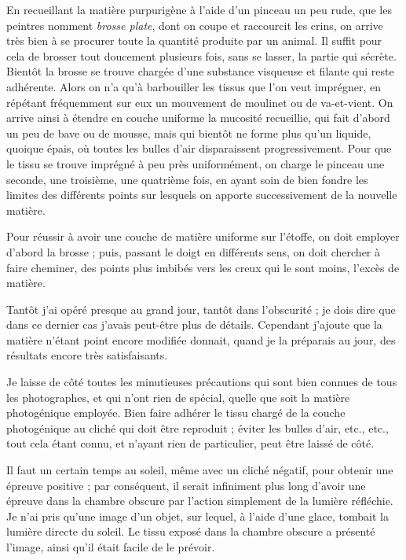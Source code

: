 \documentclass[a4paper, 11pt, oneside, polutonikogreek, french]{article}
\begin{document}
En recueillant la matière purpurigène à l'aide d'un pinceau un peu rude, que les peintres nomment \emph{brosse plate}, dont on coupe et raccourcit les crins, on arrive très bien à se procurer toute la quantité produite par un animal. Il suffit pour cela de brosser tout doucement plusieurs fois, sans se lasser, la partie qui sécrète. Bientôt la brosse se trouve chargée d'une substance visqueuse et filante qui reste adhérente. Alors on n'a qu'à barbouiller les tissus que l'on veut imprégner, en répétant fréquemment sur eux un mouvement de moulinet ou de va-et-vient. On arrive ainsi à étendre en couche uniforme la mucosité recueillie, qui fait d'abord un peu de bave ou de mousse, mais qui bientôt ne forme plus qu'un liquide, quoique épais, où toutes les bulles d'air disparaissent progressivement. Pour que le tissu se trouve imprégné à peu près uniformément, on charge le pinceau une seconde, une troisième, une quatrième fois, en ayant soin de bien fondre les limites des différents points sur lesquels on apporte successivement de la nouvelle matière.

Pour réussir à avoir une couche de matière uniforme sur l'étoffe, on doit employer d'abord la brosse ; puis, passant le doigt en différents sens, on doit chercher à faire cheminer, des points plus imbibés vers les creux qui le sont moins, l'excès de matière.

Tantôt j'ai opéré presque au grand jour, tantôt dans l'obscurité ; je dois dire que dans ce dernier cas j'avais peut-être plus de détails. Cependant j'ajoute que la matière n'étant point encore modifiée donnait, quand je la préparais au jour, des résultats encore très satisfaisants.

Je laisse de côté toutes les minutieuses précautions qui sont bien connues de tous les photographes, et qui n'ont rien de spécial, quelle que soit la matière photogénique employée. Bien faire adhérer le tissu chargé de la couche photogénique au cliché qui doit être reproduit ; éviter les bulles d'air, etc., etc., tout cela étant connu, et n'ayant rien de particulier, peut être laissé de côté.

Il faut un certain temps au soleil, même avec un cliché négatif, pour obtenir une épreuve positive ; par conséquent, il serait infiniment plus long d'avoir une épreuve dans la chambre obscure par l'action simplement de la lumière réfléchie. Je n'ai pris qu'une image d'un objet, sur lequel, à l'aide d'une glace, tombait la lumière directe du soleil. Le tissu exposé dans la chambre obscure a présenté l'image, ainsi qu'il était facile de le prévoir.
\end{document}
